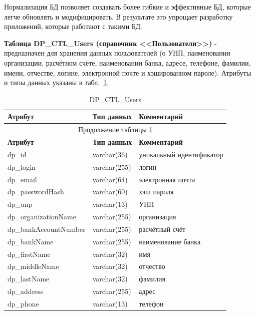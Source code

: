 Нормализация БД позволяет создавать более гибкие и эффективные БД, которые легче обновлять и модифицировать.
В результате это упрощает разработку приложений, которые работают с такими БД.

\textbf{Таблица DP\_CTL\_Users (справочник <<Пользователи>>)} -
предназначен для хранения данных пользователей
(о УНП, наименовании организации, расчётном счёте, наименовании банка, адресе,
телефоне, фамилии, имени, отчестве,
логине, электронной почте и хэшированном пароле).
Атрибуты и типы данных указаны в табл.~\ref{tab:DP_CTL_Users}.

\begin{longtable}{|p{5.5cm}|p{3.5cm}|p{7.5cm}|}
    \caption{DP\_CTL\_Users} \label{tab:DP_CTL_Users} \\
    \hline
    \textbf{Атрибут} & \textbf{Тип данных} & \textbf{Комментарий} \\ \hline
    \endfirsthead

    \multicolumn{3}{c}{Продолжение таблицы \ref{tab:DP_CTL_Users}} \\
    \hline
    \textbf{Атрибут} & \textbf{Тип данных} & \textbf{Комментарий} \\ \hline
    \endhead

    \endfoot

    \endlastfoot
    dp\_id & varchar(36) & уникальный идентификатор \\ \hline
    dp\_login & varchar(255) & логин \\ \hline
    dp\_email & varchar(64) & электронная почта \\ \hline
    dp\_passwordHash & varchar(60) & хэш пароля \\ \hline
    dp\_unp & varchar(13) & УНП \\ \hline
    dp\_organizationName & varchar(255) & организация \\ \hline
    dp\_bankAccountNumber & varchar(255) & расчётный счёт \\ \hline
    dp\_bankName & varchar(255) & наименование банка \\ \hline
    dp\_firstName & varchar(32) & имя \\ \hline
    dp\_middleName & varchar(32) & отчество \\ \hline
    dp\_lastName & varchar(32) & фамилия \\ \hline
    dp\_address & varchar(255) & адрес \\ \hline
    dp\_phone & varchar(13) & телефон \\ \hline
\end{longtable}

